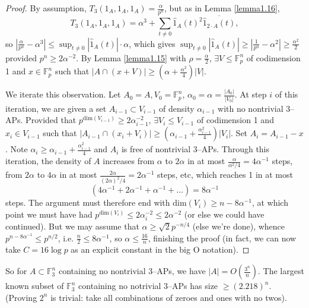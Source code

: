 \documentclass{article}
\theoremstyle{definition}
\begin{document}
\begin{proof}
    By assumption, $T_3(1_A,1_A,1_A) = \frac{\alpha}{p^n}$, but as in Lemma \ref{lemma1.16}, \[
    T_3(1_A,1_A,1_A) = \alpha^3 + \sum_{t\neq 0}^{} \hat{1}_A(t)^2 \overline{\hat{1}_{2\cdot A}(t)},
    \]
    so $\left|\frac{\alpha}{p^n}-\alpha^3 \right| \le  \sup_{t\neq 0} |\hat{1}_A(t)| \cdot \alpha$, which gives $\sup_{t\neq 0}|\hat{1}_A(t)| \ge \left|\frac{1}{p^n}-\alpha^2\right| \ge \frac{\alpha^2}{2}$ provided $p^n \ge 2\alpha^{-2}$.
    By Lemma \ref{lemma1.15} with $\rho = \frac{\alpha}{2}$, $\exists V \le \mathbb{F}_p^n$ of codimension 1 and $x \in \mathbb{F}_p^n$ such that $|A \cap (x+V)| \ge \left(\alpha +\frac{\alpha^2}{4}\right)|V|$.
    \vspace{1mm}
     
    We iterate this observation. Let $A_0 = A, V_0 = \mathbb{F}_p^n$, $\alpha_0 = \alpha = \frac{|A_0|}{|V_0|}$. At step $i$ of this iteration, we are given a set $A_{i-1} \subset V_{i-1}$ of density $\alpha_{i-1}$ with no nontrivial 3--APs. Provided that $p^{\text{dim}(V_{i-1})}\ge 2\alpha_{i-1}^{-2}$, $\exists V_i \le V_{i-1}$ of codimension 1 and $x_i \in V_{i-1}$ such that $|A_{i-1} \cap (x_i + V_i)|\ge \left(\alpha_{i-1} + \frac{\alpha_{i-1}^2}{4}\right)|V_{i}|$. Set $A_i = A_{i-1} - x$. Note $\alpha_i \ge \alpha_{i-1}+\frac{\alpha_{i-1}^2}{4}$ and $A_i$ is free of nontrivial 3--APs. Through this iteration, the density of $A$ increases from $\alpha$ to $2\alpha$ in at most $\frac{\alpha}{\alpha^2/4} = 4\alpha^{-1}$ steps, from $2\alpha$ to $4\alpha$ in at most $\frac{2\alpha}{(2\alpha)^2/4} = 2\alpha^{-1}$ steps, etc, which reaches 1 in at most 
    \[
        (4\alpha^{-1} + 2\alpha^{-1} + \alpha^{-1} + \ldots) = 8\alpha^{-1}
    \]
    steps. The argument must therefore end with $\text{dim}(V_i)\ge n - 8\alpha^{-1}$, at which point we must have had $p^{\text{dim}(V_i)}\le 2\alpha_i^{-2}\le 2\alpha^{-2}$ (or else we could have continued). But we may assume that $\alpha \ge \sqrt{2}p^{-n/4}$ (else we're done), whence $p^{n - 8 \alpha ^{-1}} \le p^{n/2}$, i.e. $\frac{n}{2} \le 8\alpha ^{-1}$, so $\alpha \le \frac{16}{n}$, finishing the proof (in fact, we can now take $C = 16\log p$ as an explicit constant in the big O notation). 
\end{proof}


So for $A \subset \mathbb{F}_3^n$ containing no nontrivial 3--APs, we have $|A| = O\left(\frac{3^n}{n}\right)$. The largest known subset of $\mathbb{F}_3^n$ containing no notrivial 3--APs has size $\ge (2.218)^n$. (Proving $2^n$ is trivial: take all combinations of zeroes and ones with no twos).
\end{document}

